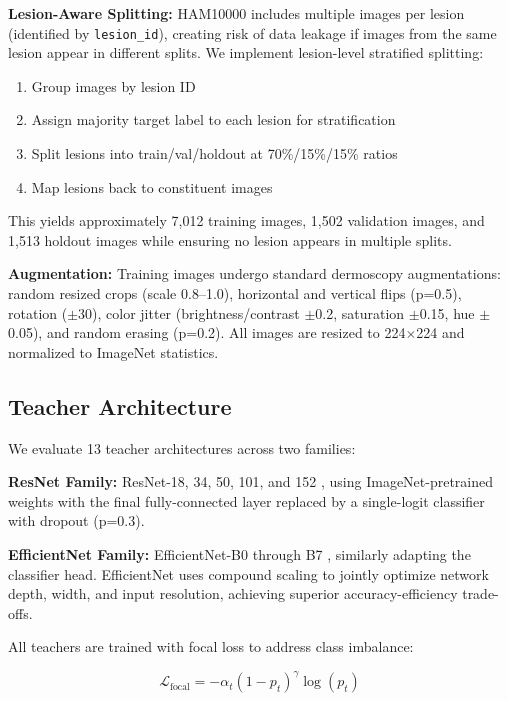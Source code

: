 \documentclass[conference]{IEEEtran}
\begin{document}
\textbf{Lesion-Aware Splitting:} HAM10000 includes multiple images per lesion (identified by \texttt{lesion\_id}), creating risk of data leakage if images from the same lesion appear in different splits. We implement lesion-level stratified splitting:

\begin{enumerate}
    \item Group images by lesion ID
    \item Assign majority target label to each lesion for stratification  
    \item Split lesions into train/val/holdout at 70\%/15\%/15\% ratios
    \item Map lesions back to constituent images
\end{enumerate}

This yields approximately 7,012 training images, 1,502 validation images, and 1,513 holdout images while ensuring no lesion appears in multiple splits.

\textbf{Augmentation:} Training images undergo standard dermoscopy augmentations: random resized crops (scale 0.8--1.0), horizontal and vertical flips (p=0.5), rotation ($\pm$30\textdegree), color jitter (brightness/contrast $\pm$0.2, saturation $\pm$0.15, hue $\pm$0.05), and random erasing (p=0.2). All images are resized to 224$\times$224 and normalized to ImageNet statistics.

\subsection{Teacher Architecture}

We evaluate 13 teacher architectures across two families:

\textbf{ResNet Family:} ResNet-18, 34, 50, 101, and 152 \cite{he2016deep}, using ImageNet-pretrained weights with the final fully-connected layer replaced by a single-logit classifier with dropout (p=0.3).

\textbf{EfficientNet Family:} EfficientNet-B0 through B7 \cite{tan2019efficientnet}, similarly adapting the classifier head. EfficientNet uses compound scaling to jointly optimize network depth, width, and input resolution, achieving superior accuracy-efficiency trade-offs.

All teachers are trained with focal loss \cite{lin2017focal} to address class imbalance:

\begin{equation}
\mathcal{L}_{\text{focal}} = -\alpha_t (1 - p_t)^\gamma \log(p_t)
\end{equation}
\end{document}
